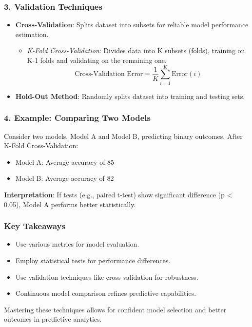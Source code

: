 \documentclass[aspectratio=169]{beamer}
\begin{document}
\begin{frame}[fragile]
  \frametitle{3. Validation Techniques}
  \begin{itemize}
    \item \textbf{Cross-Validation}: Splits dataset into subsets for reliable model performance estimation.
    
    \begin{itemize}
      \item \textit{K-Fold Cross-Validation}: Divides data into K subsets (folds), training on K-1 folds and validating on the remaining one.
      \begin{equation}
          \text{Cross-Validation Error} = \frac{1}{K}\sum_{i=1}^{K} \text{Error}(i)
      \end{equation}
    \end{itemize}
    
    \item \textbf{Hold-Out Method}: Randomly splits dataset into training and testing sets.
  \end{itemize}
\end{frame}

\begin{frame}[fragile]
  \frametitle{4. Example: Comparing Two Models}
  Consider two models, Model A and Model B, predicting binary outcomes. After K-Fold Cross-Validation:
  \begin{itemize}
    \item Model A: Average accuracy of 85%
    \item Model B: Average accuracy of 82%
  \end{itemize}
  
  \textbf{Interpretation}: If tests (e.g., paired t-test) show significant difference (p < 0.05), Model A performs better statistically.
\end{frame}

\begin{frame}[fragile]
  \frametitle{Key Takeaways}
  \begin{itemize}
    \item Use various metrics for model evaluation.
    \item Employ statistical tests for performance differences.
    \item Use validation techniques like cross-validation for robustness.
    \item Continuous model comparison refines predictive capabilities.
  \end{itemize}
  
  Mastering these techniques allows for confident model selection and better outcomes in predictive analytics.
\end{frame}
\end{document}
